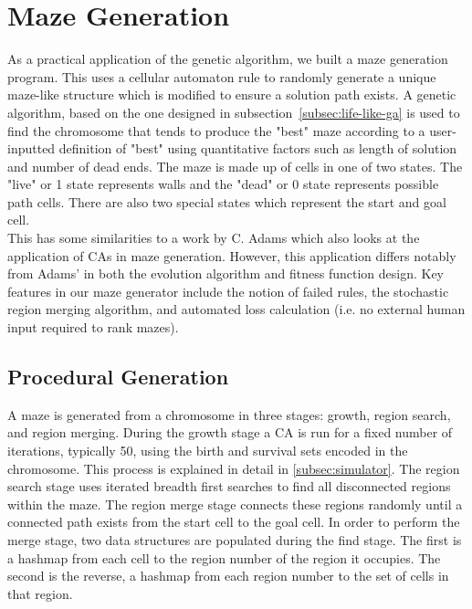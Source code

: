 \section{Maze Generation}

As a practical application of the genetic algorithm, we built a maze generation program. This uses a cellular automaton rule to randomly generate a unique maze-like structure which is modified to ensure a solution path exists. A genetic algorithm, based on the one designed in subsection~\ref{subsec:life-like-ga} is used to find the chromosome that tends to produce the "best" maze according to a user-inputted definition of "best" using quantitative factors such as length of solution and number of dead ends. The maze is made up of cells in one of two states. The "live" or 1 state represents walls and the "dead" or 0 state represents possible path cells. There are also two special states which represent the start and goal cell.\\

This has some similarities to a work by C. Adams\cite{adams2018evolving} which also looks at the application of CAs in maze generation. However, this application differs notably from Adams' in both the evolution algorithm and fitness function design. Key features in our maze generator include the notion of failed rules, the stochastic region merging algorithm, and automated loss calculation (i.e. no external human input required to rank mazes).

\subsection{Procedural Generation}
A maze is generated from a chromosome in three stages: growth, region search, and region merging. During the growth stage a CA is run for a fixed number of iterations, typically 50, using the birth and survival sets encoded in the chromosome. This process is explained in detail in \ref{subsec:simulator}. The region search stage uses iterated breadth first searches to find all disconnected regions within the maze. The region merge stage connects these regions randomly until a connected path exists from the start cell to the goal cell. In order to perform the merge stage, two data structures are populated during the find stage. The first is a hashmap from each cell to the region number of the region it occupies. The second is the reverse, a hashmap from each region number to the set of cells in that region.

